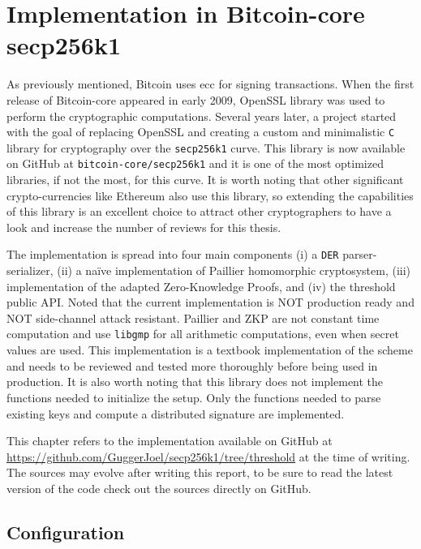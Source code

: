 \chapter{Implementation in Bitcoin-core secp256k1}
\label{chap:implementation-secp256k1}

As previously mentioned, Bitcoin uses \gls{ecc} for signing
transactions. When the first release of Bitcoin-core appeared in early 2009,
OpenSSL library was used to perform the cryptographic computations.  Several years
later, a project started with the goal of replacing OpenSSL and creating a custom
and minimalistic \texttt{C} library for cryptography over the \texttt{secp256k1} curve.
This library is now available on GitHub at \texttt{bitcoin-core/secp256k1}
and it is one of the most optimized libraries, if not the most,
for this curve. It is worth noting that other significant
crypto-currencies like Ethereum also use this library, so extending the
capabilities of this library is an excellent choice to attract other
cryptographers to have a look and increase the number of reviews for this
thesis.

The implementation is spread into four main components (i) a \texttt{DER}
parser-serializer, (ii) a naïve implementation of Paillier homomorphic
cryptosystem, (iii) implementation of the adapted Zero-Knowledge Proofs, and
(iv) the threshold public API. Noted that the current
implementation is NOT production ready and NOT side-channel attack resistant.
Paillier and ZKP are not constant time computation and use \texttt{libgmp} for
all arithmetic computations, even when secret values are used. This
implementation is a textbook implementation of the scheme and needs to be
reviewed and tested more thoroughly before being used in production. It is also worth
noting that this library does not implement the functions needed to initialize
the setup. Only the functions needed to parse existing keys and compute a
distributed signature are implemented.

This chapter refers to the implementation available on GitHub at
\url{https://github.com/GuggerJoel/secp256k1/tree/threshold} at the time of
writing. The sources may evolve after writing this report, to be sure to read
the latest version of the code check out the sources directly on GitHub.

\minitoc

\newpage

\section{Configuration}

